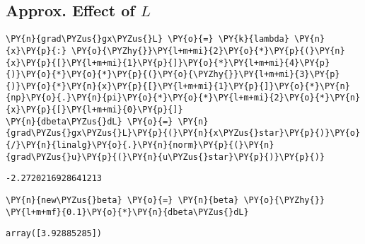     \hypertarget{approx.-effect-of-l}{%
\subsection{\texorpdfstring{Approx. Effect of
\(L\)}{Approx. Effect of L}}\label{approx.-effect-of-l}}

    \begin{tcolorbox}[breakable, size=fbox, boxrule=1pt, pad at break*=1mm,colback=cellbackground, colframe=cellborder]
\begin{Verbatim}[commandchars=\\\{\}]
\PY{n}{grad\PYZus{}gx\PYZus{}L} \PY{o}{=} \PY{k}{lambda} \PY{n}{x}\PY{p}{:} \PY{o}{\PYZhy{}}\PY{l+m+mi}{2}\PY{o}{*}\PY{p}{(}\PY{n}{x}\PY{p}{[}\PY{l+m+mi}{1}\PY{p}{]}\PY{o}{*}\PY{l+m+mi}{4}\PY{p}{)}\PY{o}{*}\PY{o}{*}\PY{p}{(}\PY{o}{\PYZhy{}}\PY{l+m+mi}{3}\PY{p}{)}\PY{o}{*}\PY{n}{x}\PY{p}{[}\PY{l+m+mi}{1}\PY{p}{]}\PY{o}{*}\PY{n}{np}\PY{o}{.}\PY{n}{pi}\PY{o}{*}\PY{o}{*}\PY{l+m+mi}{2}\PY{o}{*}\PY{n}{x}\PY{p}{[}\PY{l+m+mi}{0}\PY{p}{]}
\PY{n}{dbeta\PYZus{}dL} \PY{o}{=} \PY{n}{grad\PYZus{}gx\PYZus{}L}\PY{p}{(}\PY{n}{x\PYZus{}star}\PY{p}{)}\PY{o}{/}\PY{n}{linalg}\PY{o}{.}\PY{n}{norm}\PY{p}{(}\PY{n}{grad\PYZus{}u}\PY{p}{(}\PY{n}{u\PYZus{}star}\PY{p}{)}\PY{p}{)}
\end{Verbatim}
\end{tcolorbox}

            \begin{tcolorbox}[breakable, size=fbox, boxrule=.5pt, pad at break*=1mm, opacityfill=0]
\begin{Verbatim}[commandchars=\\\{\}]
-2.2720216928641213
\end{Verbatim}
\end{tcolorbox}
        
    \begin{tcolorbox}[breakable, size=fbox, boxrule=1pt, pad at break*=1mm,colback=cellbackground, colframe=cellborder]
\begin{Verbatim}[commandchars=\\\{\}]
\PY{n}{new\PYZus{}beta} \PY{o}{=} \PY{n}{beta} \PY{o}{\PYZhy{}} \PY{l+m+mf}{0.1}\PY{o}{*}\PY{n}{dbeta\PYZus{}dL}
\end{Verbatim}
\end{tcolorbox}

            \begin{tcolorbox}[breakable, size=fbox, boxrule=.5pt, pad at break*=1mm, opacityfill=0]
\begin{Verbatim}[commandchars=\\\{\}]
array([3.92885285])
\end{Verbatim}
\end{tcolorbox}
        
